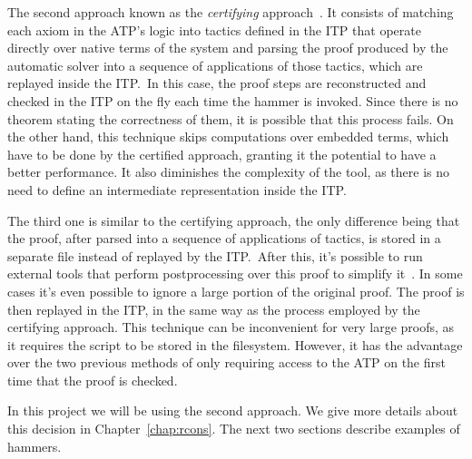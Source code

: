 The second approach known as the \textit{certifying} approach~\cite{snipe}. It consists of matching
each axiom in the ATP's logic into tactics
defined in the ITP that operate directly over native terms of the system and parsing
the proof produced by the automatic solver into a sequence of applications
of those tactics, which are replayed inside the ITP.\
In this case, the proof steps are reconstructed and checked in the ITP on the
fly each time the hammer is invoked. Since there is no theorem stating the
correctness of them, it is possible that this process fails.
On the other hand,
this technique skips computations over embedded terms, which have to be done by the
certified approach, granting it the potential to have a better
performance. It also diminishes the complexity of the tool, as there is no need to
define an intermediate representation inside the ITP.\

The third one is similar to the certifying approach, the only difference being that
the proof, after parsed into a sequence of applications of tactics, is stored in a separate
file instead of replayed by the ITP.\ After this, it's possible to run external tools
that perform postprocessing over this proof to simplify it~\cite{hammer_20, hammer_21}.
In some cases it's even possible to ignore a large
portion of the original proof. The proof is then replayed in the ITP, in the same way as the process
employed by the certifying approach. This technique can be inconvenient for very large proofs,
as it requires the script to be stored in the filesystem. However,
it has the advantage over the two previous methods of only requiring access to the ATP
on the first time that the proof is checked.

In this project we will be using the second approach. We give more details about this
decision in Chapter~\ref{chap:rcons}. The next two sections describe examples of hammers.
